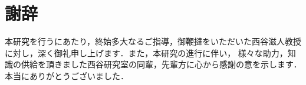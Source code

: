 \chapter*{謝辞} 
本研究を行うにあたり，終始多大なるご指導，御鞭撻をいただいた西谷滋人教授に対し，深く御礼申し上げます．また，本研究の進行に伴い，
様々な助力，知識の供給を頂きました西谷研究室の同輩，先輩方に心から感謝の意を示します．本当にありがとうございました．